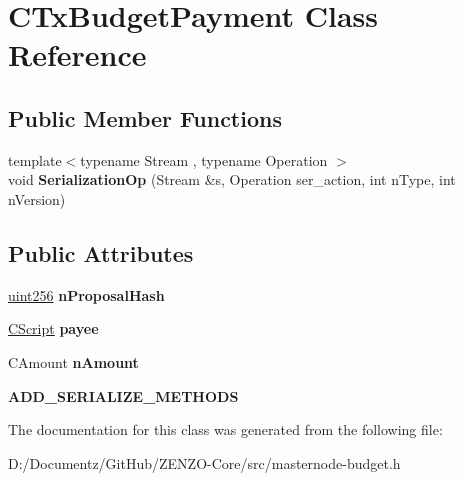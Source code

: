 \hypertarget{class_c_tx_budget_payment}{}\section{C\+Tx\+Budget\+Payment Class Reference}
\label{class_c_tx_budget_payment}
\subsection*{Public Member Functions}
\begin{DoxyCompactItemize}
\item 
\mbox{\label{class_c_tx_budget_payment_a31bd09c40afac565c4cc2dfd48a5b564}} 
{\footnotesize template$<$typename Stream , typename Operation $>$ }\\void {\bfseries Serialization\+Op} (Stream \&s, Operation ser\+\_\+action, int n\+Type, int n\+Version)
\end{DoxyCompactItemize}
\subsection*{Public Attributes}
\begin{DoxyCompactItemize}
\item 
\mbox{\label{class_c_tx_budget_payment_a288dd5a0cd2ba5761d688b77dae5b375}} 
\mbox{\hyperlink{classuint256}{uint256}} {\bfseries n\+Proposal\+Hash}
\item 
\mbox{\label{class_c_tx_budget_payment_a503a9395a6f3ff0e1d81104a3dbf5697}} 
\mbox{\hyperlink{class_c_script}{C\+Script}} {\bfseries payee}
\item 
\mbox{\label{class_c_tx_budget_payment_ac127187725282a338d140efe8ee2c4a7}} 
C\+Amount {\bfseries n\+Amount}
\item 
\mbox{\label{class_c_tx_budget_payment_a27f26b8d9973aa88f7b6bf2e908258ce}} 
{\bfseries A\+D\+D\+\_\+\+S\+E\+R\+I\+A\+L\+I\+Z\+E\+\_\+\+M\+E\+T\+H\+O\+DS}
\end{DoxyCompactItemize}


The documentation for this class was generated from the following file\+:\begin{DoxyCompactItemize}
\item 
D\+:/\+Documentz/\+Git\+Hub/\+Z\+E\+N\+Z\+O-\/\+Core/src/masternode-\/budget.\+h\end{DoxyCompactItemize}
